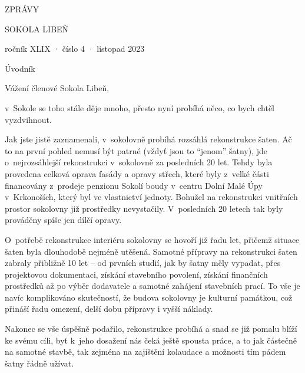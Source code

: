 \documentclass[11pt]{article}
\begin{document}
\pagecolor{sokolred}
\color{white}
\begin{center}
\vspace*{\fill}

{\titlesize \fugner ZPRÁVY}

{\titlesize \tyrs SOKOLA LIBEŇ}

\vspace*{1cm}

{\large ročník XLIX · číslo 4 · listopad 2023}

\vspace*{\fill}
\end{center}

\clearpage
\normalcolor
\nopagecolor
{}

\pagestyle{uvodnik}


{\fontsize{48pt}{57pt} \fugner \color{sokolred} \noindent Úvodník}

\vspace*{12pt}

\noindent
Vážení členové Sokola Libeň,

\noindent
v~Sokole se toho stále děje mnoho, přesto nyní probíhá něco, co bych chtěl vyzdvihnout.

Jak jste jistě zaznamenali, v~sokolovně probíhá rozsáhlá rekonstrukce šaten. Ač to na první pohled nemusí být patrné (vždyť jsou to “jenom” šatny), jde o~nejrozsáhlejší rekonstrukci v~sokolovně za posledních 20 let. Tehdy byla provedena celková oprava fasády a opravy střech, které byly z~velké části financovány z~prodeje penzionu Sokolí boudy v~centru Dolní Malé Úpy v~Krkonoších, který byl ve vlastnictví jednoty. Bohužel na rekonstrukci vnitřních prostor sokolovny již prostředky nevystačily. V~posledních 20 letech tak byly prováděny spíše jen dílčí opravy. 

O~potřebě rekonstrukce interiéru sokolovny se hovoří již řadu let, přičemž situace šaten byla dlouhodobě nejméně utěšená. Samotné přípravy na rekonstrukci šaten zabraly přibližně 10 let –⁠ od prvních studií, jak by šatny měly vypadat, přes projektovou dokumentaci, získání stavebního povolení, získání finančních prostředků až po výběr dodavatele a samotné zahájení stavebních prací. To vše je navíc komplikováno skutečností, že budova sokolovny je kulturní památkou, což přináší řadu omezení, delší dobu přípravy i vyšší náklady.

Nakonec se vše úspěšně podařilo, rekonstrukce probíhá a snad se již pomalu blíží ke svému cíli, byť k~jeho dosažení nás čeká ještě spousta práce, a to jak částečně na samotné stavbě, tak zejména na zajištění kolaudace a možnosti tím pádem šatny řádně užívat. 
\end{document}
